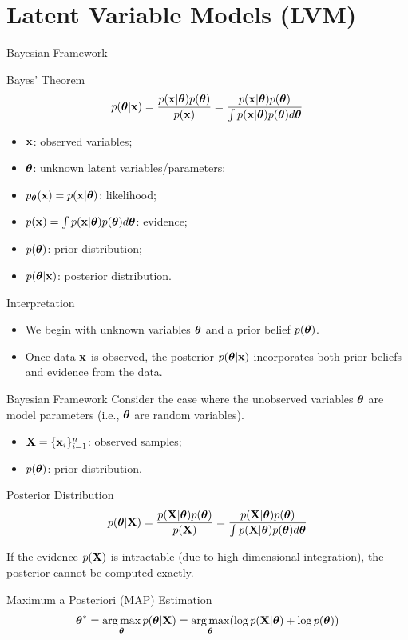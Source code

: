 \documentclass{beamer}
\renewcommand{\eqpause}{}
\begin{document}
\section{Latent Variable Models (LVM)}
\begin{frame}{Bayesian Framework}
	\begin{block}{Bayes' Theorem}
		\vspace{-0.3cm}
		\[
			p(\boldsymbol{\theta}| \mathbf{x}) = \frac{p(\mathbf{x} | \boldsymbol{\theta}) p(\boldsymbol{\theta})}{p(\mathbf{x})} = \frac{p(\mathbf{x} | \boldsymbol{\theta}) p(\boldsymbol{\theta})}{\int p(\mathbf{x} | \boldsymbol{\theta}) p(\boldsymbol{\theta}) d \boldsymbol{\theta}} 
		\]
		\vspace{-0.3cm}
		\begin{itemize}
			\item $\mathbf{x}$: observed variables; 
			\item $\boldsymbol{\theta}$: unknown latent variables/parameters;
			\item $p_{\boldsymbol{\theta}}(\mathbf{x}) = p(\mathbf{x} | \boldsymbol{\theta})$: likelihood;
			\item $p(\mathbf{x}) = \int p(\mathbf{x} | \boldsymbol{\theta}) p(\boldsymbol{\theta}) d\boldsymbol{\theta}$: evidence;
			\item $p(\boldsymbol{\theta})$: prior distribution;
			\item $p(\boldsymbol{\theta}| \mathbf{x})$: posterior distribution.
		\end{itemize}
	\end{block}
    \eqpause
	\begin{block}{Interpretation}
		\begin{itemize}
			\item We begin with unknown variables $\boldsymbol{\theta}$ and a prior belief $p(\boldsymbol{\theta})$.
			\item Once data $\mathbf{x}$ is observed, the posterior $p(\boldsymbol{\theta}| \mathbf{x})$ incorporates both prior beliefs and evidence from the data.
		\end{itemize} 
	\end{block}
\end{frame}
\begin{frame}{Bayesian Framework}
	Consider the case where the unobserved variables $\boldsymbol{\theta}$ are model parameters (i.e., $\boldsymbol{\theta}$ are random variables).
	\begin{itemize}
		\item $\mathbf{X} = \{\mathbf{x}_i\}_{i=1}^n$: observed samples;
		\item $p(\boldsymbol{\theta})$: prior distribution.
	\end{itemize}
    \eqpause
	\begin{block}{Posterior Distribution}
		\[
			p(\boldsymbol{\theta} | \mathbf{X}) = \frac{p(\mathbf{X} | \boldsymbol{\theta}) p(\boldsymbol{\theta})}{p(\mathbf{X})} = \frac{p(\mathbf{X} | \boldsymbol{\theta}) p(\boldsymbol{\theta})}{\int p(\mathbf{X} | \boldsymbol{\theta}) p(\boldsymbol{\theta}) d \boldsymbol{\theta}} 
		\]
		\vspace{-0.2cm}
	\end{block}
    \eqpause
	If the evidence $p(\mathbf{X})$ is intractable (due to high-dimensional integration), the posterior cannot be computed exactly.
    \eqpause
    \begin{block}{Maximum a Posteriori (MAP) Estimation}
	    \vspace{-0.2cm}
	    \[
	        \boldsymbol{\theta}^* = \operatorname*{arg\,max}_{\boldsymbol{\theta}} p(\boldsymbol{\theta} | \mathbf{X}) = \operatorname*{arg\,max}_{\boldsymbol{\theta}} (\log p(\mathbf{X} | \boldsymbol{\theta}) + \log p(\boldsymbol{\theta}))
	    \]
    \end{block}
\end{frame}
\end{document}
